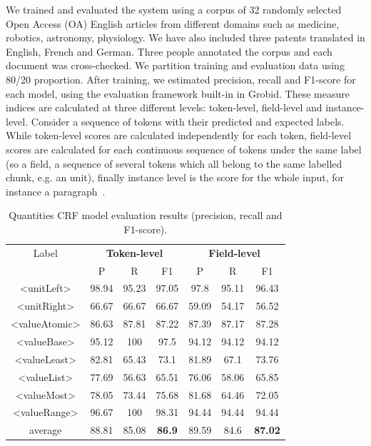 \documentclass[sigconf]{acmart}
\begin{document}
We trained and evaluated the system using a corpus of 32 randomly selected Open Access (OA) English articles from different domains such as medicine, robotics, astronomy, physiology. We have also included three patents translated in English, French and German. Three people annotated the corpus and each document was cross-checked. We partition training and evaluation data using 80/20 proportion. After training, we estimated precision, recall and F1-score for each model, using the evaluation framework built-in in Grobid. These measure indices are calculated at three different levels: token-level, field-level and instance-level. Consider a sequence of tokens with their predicted and expected labels. While token-level scores are calculated independently for each token, field-level scores are calculated for each continuous sequence of tokens under the same label (so a field, a sequence of several tokens which all belong to the same labelled chunk, e.g. an unit), finally instance level is the score for the whole input, for instance a paragraph~\cite{foppiano2019proposal}. 

\begin{table}[ht]
   \caption{Quantities CRF model evaluation results (precision, recall and F1-score).}
   \label{tab:quantities-evaluation}
   \begin{tabular}{c|ccc|ccc}
       \toprule
       Label & \multicolumn{3}{c}{\textbf{Token-level}} & \multicolumn{3}{c}{\textbf{Field-level}}\\
        & P & R & F1 & P & R & F1 \\
       \midrule
       <unitLeft>    & 98.94 & 95.23 & 97.05 & 97.8  & 95.11 & 96.43\\
       <unitRight>   & 66.67 & 66.67 & 66.67 & 59.09 & 54.17 & 56.52\\
       <valueAtomic> & 86.63 & 87.81 & 87.22 & 87.39 & 87.17 & 87.28\\
       <valueBase>   & 95.12 & 100   & 97.5  & 94.12 & 94.12 & 94.12\\
       <valueLeast>  & 82.81 & 65.43 & 73.1  & 81.89 & 67.1  & 73.76\\
       <valueList>   & 77.69 & 56.63 & 65.51 & 76.06 & 58.06 & 65.85\\
       <valueMost>   & 78.05 & 73.44 & 75.68 & 81.68 & 64.46 & 72.05\\
       <valueRange>  & 96.67 & 100   & 98.31 & 94.44 & 94.44 & 94.44\\
       \midrule
       average       & 88.81  & 85.08 & \textbf{86.9} & 89.59 & 84.6 & \textbf{87.02}\\
       \bottomrule
   \end{tabular}
\end{table}
\end{document}
